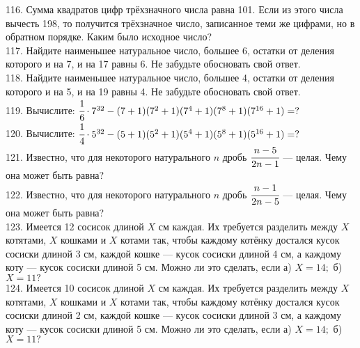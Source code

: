 116. Сумма квадратов цифр трёхзначного числа равна 101. Если из этого числа вычесть 198, то получится трёхзначное число, записанное теми же цифрами, но в обратном порядке. Каким было исходное число?\\
117. Найдите наименьшее натуральное число, большее 6, остатки от деления которого и на 7, и на 17 равны 6. Не забудьте обосновать свой ответ.\\
118. Найдите наименьшее натуральное число, большее 4, остатки от деления которого и на 5, и на 19 равны 4. Не забудьте обосновать свой ответ.\\
119. Вычислите: $\cfrac{1}{6}\cdot 7^{32}-(7+1)(7^2+1)(7^4+1)(7^8+1)(7^{16}+1)=?$\\
120. Вычислите: $\cfrac{1}{4}\cdot 5^{32}-(5+1)(5^2+1)(5^4+1)(5^8+1)(5^{16}+1)=?$\\
121. Известно, что для некоторого натурального $n$ дробь $\cfrac{n - 5}{2n - 1}$ --- целая. Чему она может быть
равна?\\
122. Известно, что для некоторого натурального $n$ дробь $\cfrac{n - 1}{2n - 5}$ --- целая. Чему она может быть
равна?\\
123. Имеется 12 сосисок длиной $X$ см каждая. Их требуется разделить между $X$ котятами, $X$ кошками и $X$ котами так, чтобы каждому котёнку достался кусок сосиски длиной 3 см, каждой кошке ---
кусок сосиски длиной 4 см, а каждому коту --- кусок сосиски длиной 5 см. Можно ли это сделать, если а) $X = 14;$ б) $X = 11?$\\
124. Имеется 10 сосисок длиной $X$ см каждая. Их требуется разделить между $X$ котятами, $X$ кошками и $X$ котами так, чтобы каждому котёнку достался кусок сосиски длиной 2 см, каждой кошке ---
кусок сосиски длиной 3 см, а каждому коту --- кусок сосиски длиной 5 см. Можно ли это сделать, если а) $X = 14;$ б) $X = 11?$
\newpage
